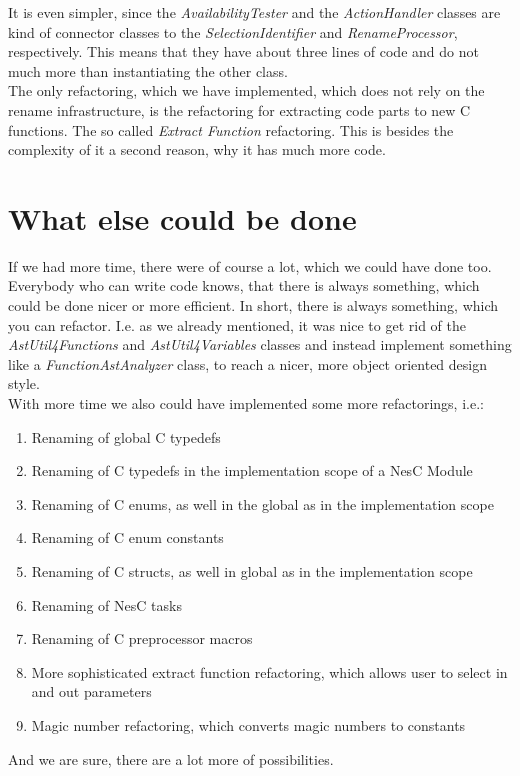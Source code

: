\documentclass[a4paper,10pt]{report}
\begin{document}
It is even simpler, since the {\it AvailabilityTester} and the {\it ActionHandler} classes are kind of connector classes to the {\it SelectionIdentifier} and {\it RenameProcessor}, respectively.
This means that they have about three lines of code and do not much more than instantiating the other class.\\
The only refactoring, which we have implemented, which does not rely on the rename infrastructure, is the refactoring for extracting code parts to new C functions.
The so called {\it Extract Function} refactoring.
This is besides the complexity of it a second reason, why it has much more code.

\section{What else could be done}
If we had more time, there were of course a lot, which we could have done too.
Everybody who can write code knows, that there is always something, which could be done nicer or more efficient.
In short, there is always something, which you can refactor.
I.e. as we already mentioned, it was nice to get rid of the {\it AstUtil4Functions} and {\it AstUtil4Variables} classes and instead implement something like a {\it FunctionAstAnalyzer} class,
to reach a nicer, more object oriented design style.\\
With more time we also could have implemented some more refactorings, i.e.:
    \begin{enumerate}
     \item Renaming of global C typedefs
     \item Renaming of C typedefs in the implementation scope of a NesC Module
     \item Renaming of C enums, as well in the global as in the implementation scope
     \item Renaming of C enum constants
     \item Renaming of C structs, as well in global as in the implementation scope
     \item Renaming of NesC tasks
     \item Renaming of C preprocessor macros
     \item More sophisticated extract function refactoring, which allows user to select in and out parameters
     \item Magic number refactoring, which converts magic numbers to constants
   \end{enumerate}
And we are sure, there are a lot more of possibilities.
\end{document}
